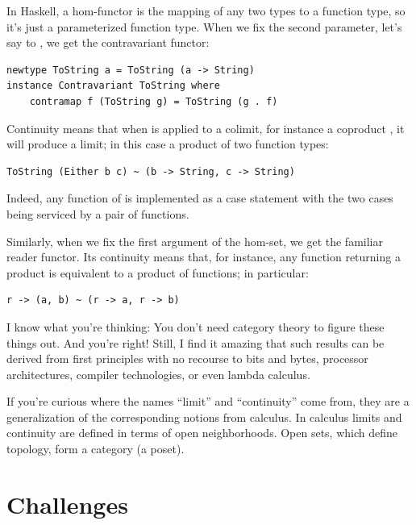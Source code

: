 In Haskell, a hom-functor is the mapping of any two types to a function
type, so it's just a parameterized function type. When we fix the second
parameter, let's say to , we get the contravariant
functor:

\begin{Verbatim}
newtype ToString a = ToString (a -> String) 
instance Contravariant ToString where 
    contramap f (ToString g) = ToString (g . f)
\end{Verbatim}

Continuity means that when  is applied to a colimit,
for instance a coproduct , it will produce a limit;
in this case a product of two function types:

\begin{Verbatim}
ToString (Either b c) ~ (b -> String, c -> String)
\end{Verbatim}
Indeed, any function of  is implemented as a case
statement with the two cases being serviced by a pair of functions.

Similarly, when we fix the first argument of the hom-set, we get the
familiar reader functor. Its continuity means that, for instance, any
function returning a product is equivalent to a product of functions; in
particular:

\begin{Verbatim}
r -> (a, b) ~ (r -> a, r -> b)
\end{Verbatim}
I know what you're thinking: You don't need category theory to figure
these things out. And you're right! Still, I find it amazing that such
results can be derived from first principles with no recourse to bits
and bytes, processor architectures, compiler technologies, or even
lambda calculus.

If you're curious where the names ``limit'' and ``continuity'' come
from, they are a generalization of the corresponding notions from
calculus. In calculus limits and continuity are defined in terms of open
neighborhoods. Open sets, which define topology, form a category (a
poset).

\section{Challenges}

